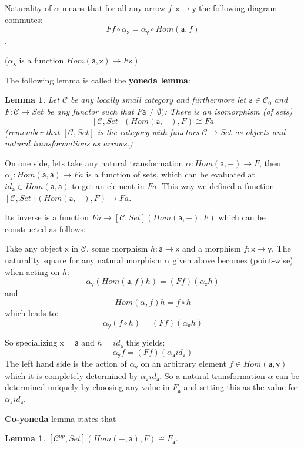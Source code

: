 \documentclass{article}
\newcommand{\cat}[1]{\mathcal{#1}} %
\newcommand{\cato}[1]{\cat{#1}_0} %
\newcommand{\ob}[1]{\mathsf{#1}} %
\newcommand{\catop}[1]{\cat{#1}^{op}}
\newtheorem{lemma}[theorem]{Lemma}
\begin{document}
Naturality of $\alpha$ means that for all any arrow $f: \ob{x} \rightarrow \ob{y}$ the following diagram commutes: $$Ff \circ \alpha_\ob{x} = \alpha_\ob{y} \circ Hom(\ob{a}, f)$$.

($\alpha_\ob{x}$ is a function $Hom(\ob{a}, \ob{x}) \rightarrow F\ob{x}$.)

The following lemma is called the \textbf{yoneda lemma}:
\begin{lemma}
	Let $\cat{C}$ be any locally small category and furthermore let $\ob{a} \in \cato{C}$ and $F: \cat{C} \rightarrow Set$ be any functor such that $F\ob{a} \neq \emptyset)$:
	There is an isomorphism (of sets) $$[\cat{C}, Set](Hom(\ob{a}, -), F) \cong Fa$$
	(remember that $[\cat{C}, Set]$ is the category with functors $\cat{C} \rightarrow Set$ as objects and natural transformations as arrows.)
\end{lemma}

On one side, lets take any natural transformation $\alpha: Hom(\ob{a}, -) \rightarrow F$, then $\alpha_\ob{a}: Hom(\ob{a}, \ob{a}) \rightarrow Fa$ is a function of sets, which can be evaluated at
$id_\ob{a} \in Hom(\ob{a}, \ob{a})$ to get an element in $Fa$.
This way we defined a function $[\cat{C}, Set](Hom(\ob{a}, -), F) \rightarrow Fa$.

Its inverse is a function $Fa \rightarrow [\cat{C}, Set](Hom(\ob{a}, -), F)$ which can be constructed as follows:

Take any object $\ob{x}$ in $\cat{C}$, some morphism $h: \ob{a} \rightarrow \ob{x}$ and a morphism $f: \ob{x} \rightarrow \ob{y}$.
The naturality square for any natural morphism $\alpha$ given above becomes (point-wise) when acting on $h$:
$$\alpha_\ob{y}(Hom(\ob{a}, f)h) = (Ff)(\alpha_\ob{x}h)$$
and $$Hom(\alpha, f)h = f \circ h$$
which leads to:
$$\alpha_\ob{y}(f \circ h) = (Ff)(\alpha_\ob{x}h)$$

So specializing $\ob{x} = \ob{a}$ and $h = id_\ob{a}$ this yields:
$$\alpha_\ob{y}f = (Ff)(\alpha_\ob{a}id_\ob{a})$$
The left hand side is the action of $\alpha_\ob{y}$ on an arbitrary element $f \in Hom(\ob{a}, \ob{y})$ which it is completely determined by $\alpha_\ob{a}id_\ob{a}$.
So a natural transformation $\alpha$ can be determined uniquely by choosing any value in $F_\ob{a}$ and setting this as the value for $\alpha_\ob{a} id_\ob{a}$.

\textbf{Co-yoneda} lemma states that

\begin{lemma}
	$[\catop{C}, Set](Hom(-, \ob{a}), F) \cong F_\ob{a}$.
\end{lemma}
\end{document}
